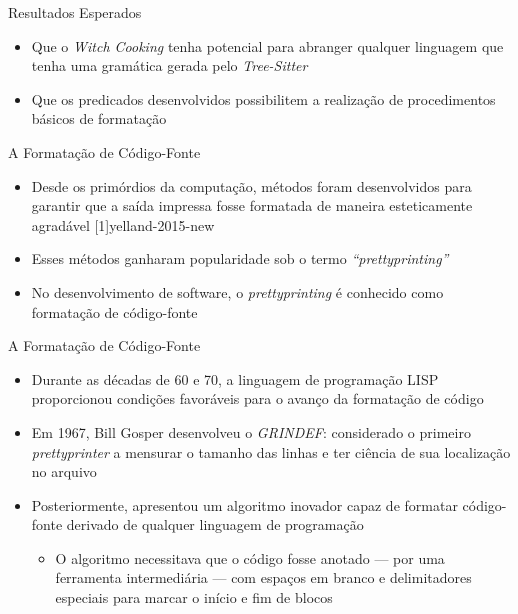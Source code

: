\documentclass
  [ aspectratio=169,
    english,
    hyperref={citecolor=blue,colorlinks=true,linkcolor=blue,urlcolor=blue},
    brazil]
  {beamer}
\newcommand{\treesitter}{\textit{Tree-Sitter}\xspace}
\newcommand{\witchcooking}{\textit{Witch Cooking}\xspace}
\begin{document}

  \begin{frame}{Resultados Esperados}
    \begin{itemize}
      \item Que o \witchcooking tenha potencial para abranger qualquer
            linguagem que tenha uma gramática gerada pelo \treesitter
      \item Que os predicados desenvolvidos possibilitem a realização de
            procedimentos básicos de formatação
    \end{itemize}
  \end{frame}


  \begin{frame}{A Formatação de Código-Fonte}
    \begin{itemize}
      \item Desde os primórdios da computação, métodos foram desenvolvidos para
            garantir que a saída impressa fosse formatada de maneira
            esteticamente agradável
            [1]{yelland-2015-new}
      \item Esses métodos ganharam popularidade sob o termo
            \textit{``prettyprinting''}
      \item No desenvolvimento de software, o \textit{prettyprinting} é
            conhecido como formatação de código-fonte
    \end{itemize}
  \end{frame}

  \begin{frame}{A Formatação de Código-Fonte}
    \begin{itemize}
      \item Durante as décadas de 60 e 70, a linguagem de programação LISP
            proporcionou condições favoráveis para o avanço da formatação de
            código \cite[2]{yelland-2015-new}
      \item Em 1967, Bill Gosper desenvolveu o \textit{GRINDEF}: considerado o
            primeiro \textit{prettyprinter} a mensurar o tamanho das linhas e
            ter ciência de sua localização no arquivo
            \cites{gosper-2023-twubblesome}{griesemer-2022-cultural}
      \item Posteriormente, \textcite{oppen-1980-prettyprinting} apresentou um
            algoritmo inovador capaz de formatar código-fonte derivado de
            qualquer linguagem de programação
            \begin{itemize}
              \item O algoritmo necessitava que o código fosse anotado --- por
                    uma ferramenta intermediária --- com espaços em branco e
                    delimitadores especiais para marcar o início e fim de
                    blocos
            \end{itemize}
    \end{itemize}
  \end{frame}
\end{document}

